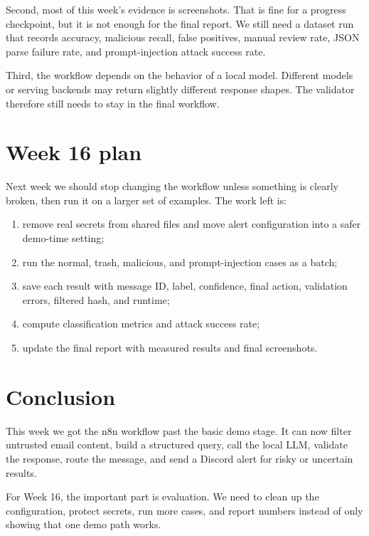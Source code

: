 \documentclass[11pt,a4paper]{article}
\begin{document}
Second, most of this week's evidence is screenshots. That is fine for a progress
checkpoint, but it is not enough for the final report. We still need a dataset
run that records accuracy, malicious recall, false positives, manual review
rate, JSON parse failure rate, and prompt-injection attack success rate.

Third, the workflow depends on the behavior of a local model. Different models
or serving backends may return slightly different response shapes. The validator
therefore still needs to stay in the final workflow.

\section{Week 16 plan}

Next week we should stop changing the workflow unless something is clearly
broken, then run it on a larger set of examples. The work left is:

\begin{enumerate}
  \item remove real secrets from shared files and move alert configuration into a safer demo-time setting;
  \item run the normal, trash, malicious, and prompt-injection cases as a batch;
  \item save each result with message ID, label, confidence, final action, validation errors, filtered hash, and runtime;
  \item compute classification metrics and attack success rate;
  \item update the final report with measured results and final screenshots.
\end{enumerate}

\section{Conclusion}

This week we got the n8n workflow past the basic demo stage. It can now filter
untrusted email content, build a structured query, call the local LLM, validate
the response, route the message, and send a Discord alert for risky or uncertain
results.

For Week 16, the important part is evaluation. We need to clean up the
configuration, protect secrets, run more cases, and report numbers instead of
only showing that one demo path works.
\end{document}
